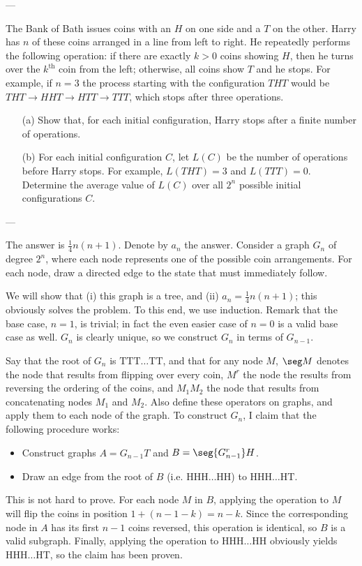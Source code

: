 
---

The Bank of Bath issues coins with an $H$ on one side and a $T$ on the other. Harry has $n$ of these coins arranged in a line from left to right. He repeatedly performs the following operation: if there are exactly $k>0$ coins showing $H$, then he turns over the $k^\text{th}$ coin from the left; otherwise, all coins show $T$ and he stops. For example, if $n=3$ the process starting with the configuration $THT$ would be $THT\to HHT\to HTT\to TTT$, which stops after three operations.
\begin{itemize}
    \item[(a)] Show that, for each initial configuration, Harry stops after a finite number of operations.
        \vspace{-0.5em}
    \item[(b)] For each initial configuration $C$, let $L(C)$ be the number of operations before Harry stops. For example, $L(THT)=3$ and $L(TTT)=0$. Determine the average value of $L(C)$ over all $2^n$ possible initial configurations $C$.
\end{itemize}

---

The answer is $\tfrac14n(n+1)$. Denote by $a_n$ the answer. Consider a graph $G_n$ of degree $2^n$, where each node represents one of the possible coin arrangements. For each node, draw a directed edge to the state that must immediately follow.

We will show that (i) this graph is a tree, and (ii) $a_n=\tfrac14n(n+1)$; this obviously solves the problem. To this end, we use induction. Remark that the base case, $n=1$, is trivial; in fact the even easier case of $n=0$ is a valid base case as well. $G_n$ is clearly unique, so we construct $G_n$ in terms of $G_{n-1}$.

Say that the root of $G_n$ is $\text{TTT}\ldots\text{TT}$, and that for any node $M$, $\seg M$ denotes the node that results from flipping over every coin, $M^r$ the node the results from reversing the ordering of the coins, and $M_1M_2$ the node that results from concatenating nodes $M_1$ and $M_2$. Also define these operators on graphs, and apply them to each node of the graph. To construct $G_n$, I claim that the following procedure works:
\begin{itemize}
    \item Construct graphs $A=G_{n-1}T$ and $B=\seg{G_{n-1}^r}H$.
        \vspace{-0.5em}
    \item Draw an edge from the root of $B$ (i.e. $\text{HHH}\ldots\text{HH}$) to $\text{HHH}\ldots\text{HT}$.
\end{itemize}
This is not hard to prove. For each node $M$ in $B$, applying the operation to $M$ will flip the coins in position $1+(n-1-k)=n-k$. Since the corresponding node in $A$ has its first $n-1$ coins reversed, this operation is identical, so $B$ is a valid subgraph. Finally, applying the operation to $\text{HHH}\ldots\text{HH}$ obviously yields $\text{HHH}\ldots\text{HT}$, so the claim has been proven.

